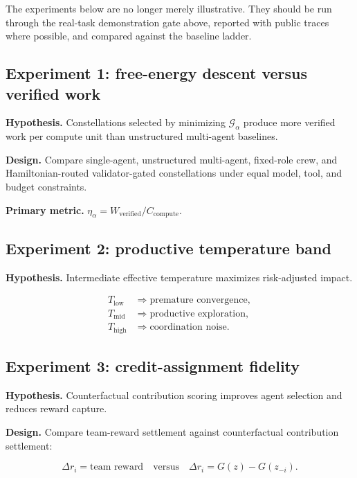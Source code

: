 \documentclass[
  11pt,
]{article}
\begin{document}
The experiments below are no longer merely illustrative. They should be
run through the real-task demonstration gate above, reported with public
traces where possible, and compared against the baseline ladder.

\subsection{Experiment 1: free-energy descent versus verified
work}\label{experiment-1-free-energy-descent-versus-verified-work}

\textbf{Hypothesis.} Constellations selected by minimizing
\(\mathcal{G}_{\alpha}\) produce more verified work per compute unit
than unstructured multi-agent baselines.

\textbf{Design.} Compare single-agent, unstructured multi-agent,
fixed-role crew, and Hamiltonian-routed validator-gated constellations
under equal model, tool, and budget constraints.

\textbf{Primary metric.}
\(\eta_{\alpha}=W_{\mathrm{verified}}/C_{\mathrm{compute}}\).

\subsection{Experiment 2: productive temperature
band}\label{experiment-2-productive-temperature-band}

\textbf{Hypothesis.} Intermediate effective temperature maximizes
risk-adjusted impact.

\[
\begin{aligned}
T_{\mathrm{low}}&\Rightarrow\text{premature convergence},\\
T_{\mathrm{mid}}&\Rightarrow\text{productive exploration},\\
T_{\mathrm{high}}&\Rightarrow\text{coordination noise}.
\end{aligned}
\]

\subsection{Experiment 3: credit-assignment
fidelity}\label{experiment-3-credit-assignment-fidelity}

\textbf{Hypothesis.} Counterfactual contribution scoring improves agent
selection and reduces reward capture.

\textbf{Design.} Compare team-reward settlement against counterfactual
contribution settlement:

\[
\Delta r_i=\text{team reward}
\quad\text{versus}\quad
\Delta r_i=G(z)-G(z_{-i}).
\]
\end{document}
